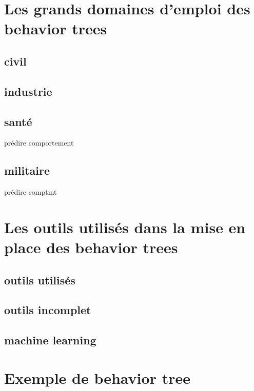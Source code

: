 \documentclass[titlepage]{article}
\begin{document}
	\clearpage
	\section{Les grands domaines d'emploi des behavior trees}
		\subsection{civil}
	
		\subsection{industrie}
	
		\subsection{santé}
	prédire comportement
	
		\subsection{militaire}
	prédire comptmt
	
	\clearpage
	\section{Les outils utilisés dans la mise en place des behavior trees}
		\subsection{outils utilisés}
		\subsection{outils incomplet}
		\subsection{machine learning}
	
	\clearpage
	\section{Exemple de behavior tree}
	
	\clearpage
	
	
	
\end{document}
